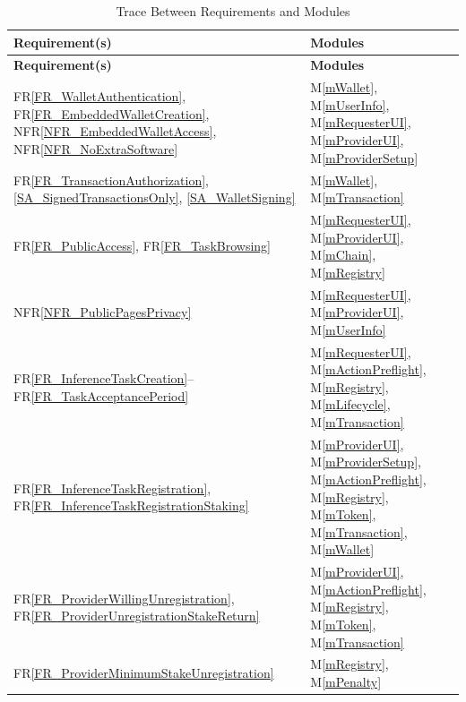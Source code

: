 \documentclass[12pt, titlepage]{article}
\newcommand{\mref}[1]{M\ref{#1}}
\newcommand{\rref}[1]{FR\ref{#1}}
\newcommand{\nfrref}[1]{NFR\ref{#1}}
\begin{document}
\begin{longtable}{|p{}|p{}|}
\caption{Trace Between Requirements and Modules}
\label{TblRT} \\
\hline
\textbf{Requirement(s)} & \textbf{Modules} \\
\hline
\endfirsthead

\hline
\textbf{Requirement(s)} & \textbf{Modules} \\
\hline
\endhead

\hline
\endfoot

\rref{FR_WalletAuthentication}, \rref{FR_EmbeddedWalletCreation},
\nfrref{NFR_EmbeddedWalletAccess}, \nfrref{NFR_NoExtraSoftware}
& \mref{mWallet}, \mref{mUserInfo}, \mref{mRequesterUI},
\mref{mProviderUI}, \mref{mProviderSetup} \\
\hline

\rref{FR_TransactionAuthorization}, \ref{SA_SignedTransactionsOnly},
\ref{SA_WalletSigning}
& \mref{mWallet}, \mref{mTransaction} \\
\hline

\rref{FR_PublicAccess}, \rref{FR_TaskBrowsing}
& \mref{mRequesterUI}, \mref{mProviderUI}, \mref{mChain},
\mref{mRegistry} \\
\hline

\nfrref{NFR_PublicPagesPrivacy}
& \mref{mRequesterUI}, \mref{mProviderUI}, \mref{mUserInfo} \\
\hline

\rref{FR_InferenceTaskCreation}--\rref{FR_TaskAcceptancePeriod}
& \mref{mRequesterUI}, \mref{mActionPreflight}, \mref{mRegistry},
\mref{mLifecycle}, \mref{mTransaction} \\
\hline

\rref{FR_InferenceTaskRegistration},
\rref{FR_InferenceTaskRegistrationStaking}
& \mref{mProviderUI}, \mref{mProviderSetup}, \mref{mActionPreflight},
\mref{mRegistry}, \mref{mToken}, \mref{mTransaction}, \mref{mWallet} \\
\hline

\rref{FR_ProviderWillingUnregistration},
\rref{FR_ProviderUnregistrationStakeReturn}
& \mref{mProviderUI}, \mref{mActionPreflight}, \mref{mRegistry},
\mref{mToken}, \mref{mTransaction} \\
\hline

\rref{FR_ProviderMinimumStakeUnregistration}
& \mref{mRegistry}, \mref{mPenalty} \\
\hline


\end{longtable}
\end{document}
